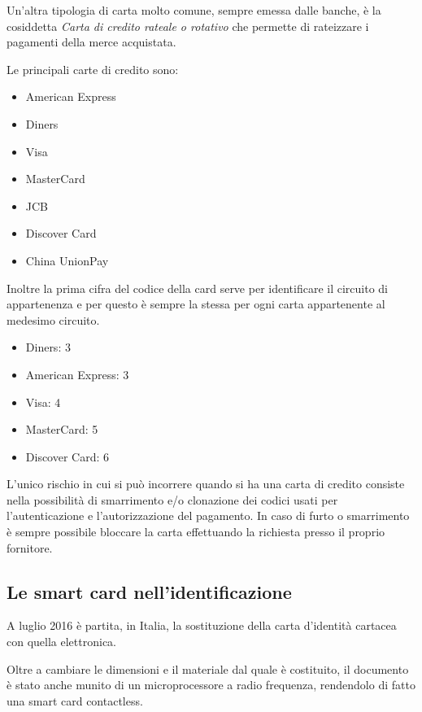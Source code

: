 Un'altra tipologia di carta molto comune, sempre emessa dalle banche, è la cosiddetta \textit{Carta di credito rateale o rotativo} che permette di rateizzare i pagamenti della merce acquistata.

Le principali carte di credito sono:
\begin{itemize}
    \item American Express
    \item Diners
    \item Visa
    \item MasterCard
    \item JCB
    \item Discover Card
    \item China UnionPay
\end{itemize}

Inoltre la prima cifra del codice della card serve per identificare il circuito di appartenenza e per questo è sempre la stessa per ogni carta appartenente al medesimo circuito.
\begin{itemize}
    \item Diners: 3
    \item American Express: 3
    \item Visa: 4
    \item MasterCard: 5
    \item Discover Card: 6
\end{itemize}

L'unico rischio in cui si può incorrere quando si ha una carta di credito consiste nella possibilità di smarrimento e/o clonazione dei codici usati per l'autenticazione e l'autorizzazione del pagamento. In caso di furto o smarrimento è sempre possibile bloccare la carta effettuando la richiesta presso il proprio fornitore.
\cite{Wiki_cc}

\subsection{Le smart card nell'identificazione}
\label{carta_identita_elettronica}
A luglio 2016 è partita, in Italia, la sostituzione della carta d'identità cartacea con quella elettronica.

Oltre a cambiare le dimensioni e il materiale dal quale è costituito, il documento è stato anche munito di un microprocessore a radio frequenza, rendendolo di fatto una smart card contactless.

